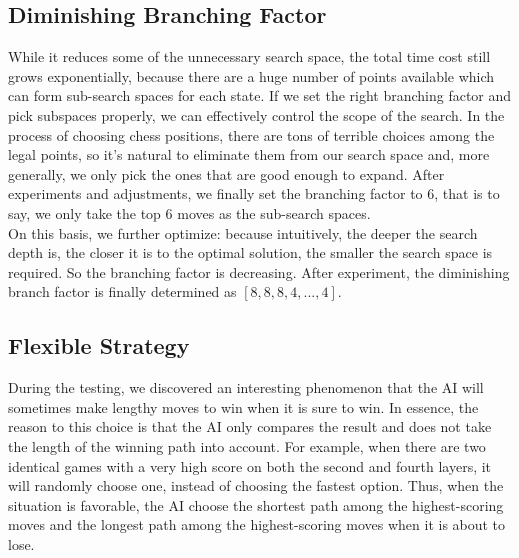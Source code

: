\documentclass[a4paper, 12pt]{article} %
\begin{document}
\begin{multicols}{2}
  \subsection{Diminishing Branching Factor}
    While it reduces some of the unnecessary search space, the total time cost still grows exponentially, because there are a huge number of points available which can form sub-search spaces for each state. If we set the right branching factor and pick subspaces properly, we can effectively control the scope of the search. In the process of choosing chess positions, there are tons of terrible choices among the legal points, so it's natural to eliminate them from our search space and, more generally, we only pick the ones that are good enough to expand. After experiments and adjustments, we finally set the branching factor to 6, that is to say, we only take the top 6 moves as the sub-search spaces.\\
    On this basis, we further optimize: because intuitively, the deeper the search depth is, the closer it is to the optimal solution, the smaller the search space is required. So the branching factor is decreasing. After experiment, the diminishing branch factor is finally determined as $[8, 8, 8, 4,..., 4]$.
    

  \subsection{Flexible Strategy}
    During the testing, we discovered an interesting phenomenon that the AI will sometimes make lengthy moves to win when it is sure to win. In essence, the reason to this choice is that the AI only compares the result and does not take the length of the winning path into account. For example, when there are two identical games with a very high score on both the second and fourth layers, it will randomly choose one, instead of choosing the fastest option.
    Thus, when the situation is favorable, the AI choose the shortest path among the highest-scoring moves and the longest path among the highest-scoring moves when it is about to lose.
\end{multicols}
\end{document}
